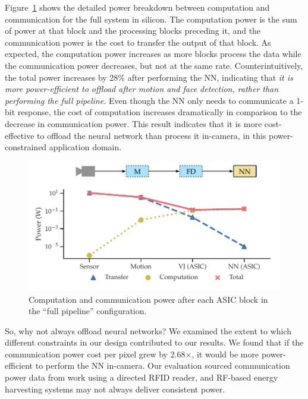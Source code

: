 Figure~\ref{fig:full-face-auth-pipeline} shows the detailed power breakdown between computation and communication for the full system in silicon. The computation power is the sum of power at that block and the processing blocks preceding it, and the communication power is the cost to transfer the output of that block. As expected, the computation power increases as more blocks process the data while the communication power decreases, but not at the same rate. Counterintuitively, the total power increases by 28\% after performing the NN, indicating that \textit{it is more power-efficient to offload after motion and face detection, rather than performing the full pipeline.} Even though the NN only needs to communicate a 1-bit response, the cost of computation increases dramatically in comparison to the decrease in communication power. This result indicates that it is more cost-effective to offload the neural network than process it in-camera, in this power-constrained application domain.

\begin{figure}
\centering
    \begin{center}
      \includegraphics[width=\textwidth]{nsp-figs/FA_compute_compress_4up_fig_2.pdf}
    \end{center}
    \caption{Computation and communication power after each ASIC block in the ``full pipeline'' configuration.}
    \label{fig:full-face-auth-pipeline}
\end{figure}

So, why not always offload neural networks? We examined the extent to which different constraints in our design contributed to our results. We found that if the communication power cost per pixel grew by 2.68$\times$, it would be more power-efficient to perform the NN in-camera. Our evaluation sourced communication power data from work using a directed RFID reader, and RF-based energy harvesting systems may not always deliver consistent power.

